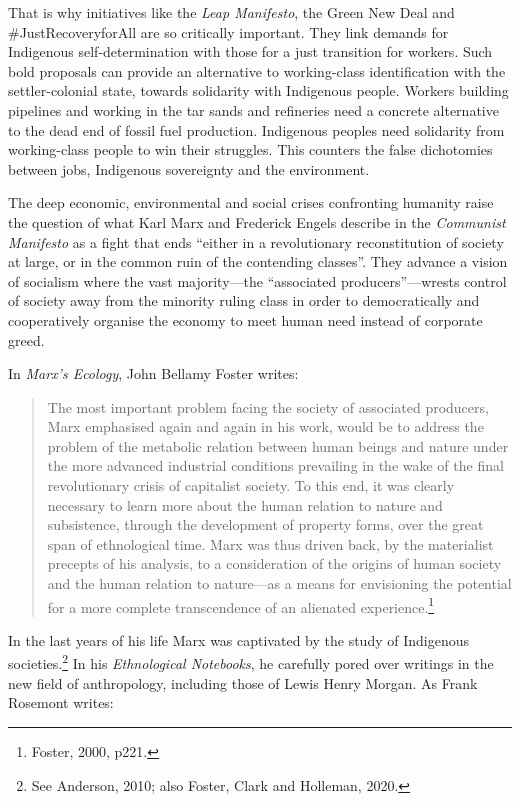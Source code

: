 That is why initiatives like the \emph{Leap Manifesto}, the Green New Deal and \#JustRecoveryforAll are so critically important. They link demands for Indigenous self-determination with those for a just transition for workers. Such bold proposals can provide an alternative to working-class identification with the settler-colonial state, towards solidarity with Indigenous people. Workers building pipelines and working in the tar sands and refineries need a concrete alternative to the dead end of fossil fuel production. Indigenous peoples need solidarity from working-class people to win their struggles. This counters the false dichotomies between jobs, Indigenous sovereignty and the environment.

The deep economic, environmental and social crises confronting humanity raise the question of what Karl Marx and Frederick Engels describe in the \emph{Communist Manifesto} as a fight that ends ``either in a revolutionary reconstitution of society at large, or in the common ruin of the contending classes''. They advance a vision of socialism where the vast majority---the ``associated producers''---wrests control of society away from the minority ruling class in order to democratically and cooperatively organise the economy to meet human need instead of corporate greed.

In \emph{Marx's Ecology}, John Bellamy Foster writes:

\blockquote{The most important problem facing the society of associated producers, Marx emphasised again and again in his work, would be to address the problem of the metabolic relation between human beings and nature under the more advanced industrial conditions prevailing in the wake of the final revolutionary crisis of capitalist society. To this end, it was clearly necessary to learn more about the human relation to nature and subsistence, through the development of property forms, over the great span of ethnological time. Marx was thus driven back, by the materialist precepts of his analysis, to a consideration of the origins of human society and the human relation to nature---as a means for envisioning the potential for a more complete transcendence of an alienated experience.\footnote{Foster, 2000, p221.}}

In the last years of his life Marx was captivated by the study of Indigenous societies.\footnote{See Anderson, 2010; also Foster, Clark and Holleman, 2020.} In his \emph{Ethnological Notebooks}, he carefully pored over writings in the new field of anthropology, including those of Lewis Henry Morgan. As Frank Rosemont writes:

